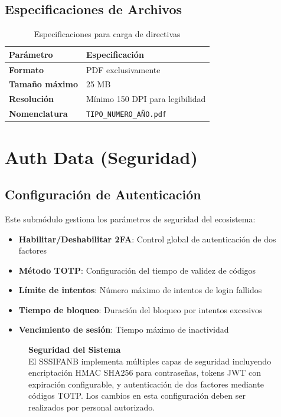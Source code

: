 \subsection*{Especificaciones de Archivos}

\begin{longtable}{p{3cm}p{9cm}}
\toprule
\textbf{Parámetro} & \textbf{Especificación} \\
\midrule
\endhead
\bottomrule
\caption{Especificaciones para carga de directivas}
\label{tab:especificaciones-directivas}
\endlastfoot

\textbf{Formato} & PDF exclusivamente \\
\textbf{Tamaño máximo} & 25 MB \\
\textbf{Resolución} & Mínimo 150 DPI para legibilidad \\
\textbf{Nomenclatura} & \texttt{TIPO\_NUMERO\_AÑO.pdf} \\
\end{longtable}

\section{Auth Data (Seguridad)}

\subsection*{Configuración de Autenticación}

Este submódulo gestiona los parámetros de seguridad del ecosistema:

\begin{itemize}[leftmargin=*]
    \item \textbf{Habilitar/Deshabilitar 2FA}: Control global de autenticación de dos factores
    \item \textbf{Método TOTP}: Configuración del tiempo de validez de códigos
    \item \textbf{Límite de intentos}: Número máximo de intentos de login fallidos
    \item \textbf{Tiempo de bloqueo}: Duración del bloqueo por intentos excesivos
    \item \textbf{Vencimiento de sesión}: Tiempo máximo de inactividad
\end{itemize}

\begin{figure}[H]
\centering
\begin{tcolorbox}[
    enhanced,
    colback=sandraSoft,
    colframe=sandraGreen,
    width=0.9\textwidth,
    halign=center
]
\small
\textbf{Seguridad del Sistema}\\
\smallskip
El SSSIFANB implementa múltiples capas de seguridad incluyendo encriptación HMAC SHA256 para contraseñas, tokens JWT con expiración configurable, y autenticación de dos factores mediante códigos TOTP. Los cambios en esta configuración deben ser realizados por personal autorizado.
\end{tcolorbox}
\end{figure}

